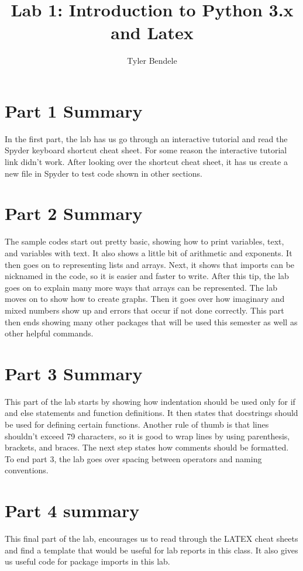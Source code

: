 \documentclass{article}
\title{Lab 1: Introduction to Python 3.x and Latex}
\author{Tyler Bendele}
\begin{document}
\maketitle


\section{Part 1 Summary}
In the first part, the lab has us go through an interactive tutorial and read the Spyder keyboard shortcut cheat sheet. For some reason the interactive tutorial link didn't work. After looking over the shortcut cheat sheet, it has us create a new file in Spyder to test code shown in other sections.

\section{Part 2 Summary}
The sample codes start out pretty basic, showing how to print variables, text, and variables with text. It also shows a little bit of arithmetic and exponents. It then goes on to representing lists and arrays. Next, it shows that imports can be nicknamed in the code, so it is easier and faster to write. After this tip, the lab goes on to explain many more ways that arrays can be represented. The lab moves on to show how to create graphs. Then it goes over how imaginary and mixed numbers show up and errors that occur if not done correctly. This part then ends showing many other packages that will be used this semester as well as other helpful commands.

\section{Part 3 Summary}
This part of the lab starts by showing how indentation should be used only for if and else statements and function definitions. It then states that docstrings should be used for defining certain functions. Another rule of thumb is that lines shouldn't exceed 79 characters, so it is good to wrap lines by using parenthesis, brackets, and braces. The next step states how comments should be formatted. To end part 3, the lab goes over spacing between operators and naming conventions.

\section{Part 4 summary}
This final part of the lab, encourages us to read through the LATEX cheat sheets and find a template that would be useful for lab reports in this class. It also gives us useful code for package imports in this lab.
\end{document}
